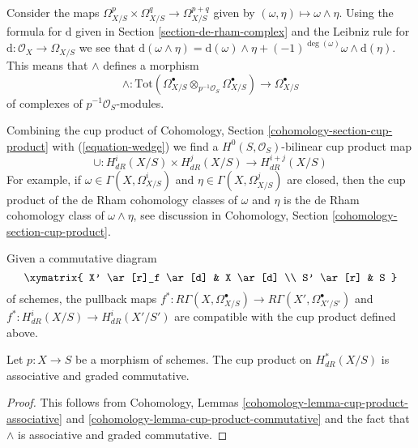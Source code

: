 \noindent
Consider the maps
$\Omega^p_{X/S} \times \Omega^q_{X/S} \to \Omega^{p + q}_{X/S}$
given by $(\omega , \eta) \longmapsto \omega \wedge \eta$.
Using the formula for $\text{d}$ given in Section \ref{section-de-rham-complex}
and the Leibniz rule for $\text{d} : \mathcal{O}_X \to \Omega_{X/S}$
we see that $\text{d}(\omega \wedge \eta) = \text{d}(\omega) \wedge \eta +
(-1)^{\deg(\omega)} \omega \wedge \text{d}(\eta)$. This means that
$\wedge$ defines a morphism
\begin{equation}
\label{equation-wedge}
\wedge :
\text{Tot}(
\Omega^\bullet_{X/S} \otimes_{p^{-1}\mathcal{O}_S} \Omega^\bullet_{X/S})
\longrightarrow
\Omega^\bullet_{X/S}
\end{equation}
of complexes of $p^{-1}\mathcal{O}_S$-modules.

\medskip\noindent
Combining the cup product of
Cohomology, Section \ref{cohomology-section-cup-product}
with (\ref{equation-wedge}) we find a
$H^0(S, \mathcal{O}_S)$-bilinear cup product map
$$
\cup : H^i_{dR}(X/S) \times H^j_{dR}(X/S) \longrightarrow H^{i + j}_{dR}(X/S)
$$
For example, if $\omega \in \Gamma(X, \Omega^i_{X/S})$ and
$\eta \in \Gamma(X, \Omega^j_{X/S})$ are closed, then
the cup product of the de Rham cohomology classes of
$\omega$ and $\eta$ is the de Rham cohomology class of $\omega \wedge \eta$,
see discussion in Cohomology, Section \ref{cohomology-section-cup-product}.

\medskip\noindent
Given a commutative diagram
$$
\xymatrix{
X' \ar[r]_f \ar[d] & X \ar[d] \\
S' \ar[r] & S
}
$$
of schemes, the pullback maps
$f^* : R\Gamma(X, \Omega^\bullet_{X/S}) \to R\Gamma(X', \Omega^\bullet_{X'/S'})$
and
$f^* : H^i_{dR}(X/S) \longrightarrow H^i_{dR}(X'/S')$
are compatible with the cup product defined above.

\begin{lemma}
\label{lemma-cup-product-graded-commutative}
Let $p : X \to S$ be a morphism of schemes.
The cup product on $H^*_{dR}(X/S)$ is associative and
graded commutative.
\end{lemma}

\begin{proof}
This follows from
Cohomology, Lemmas \ref{cohomology-lemma-cup-product-associative} and
\ref{cohomology-lemma-cup-product-commutative}
and the fact that $\wedge$ is associative and graded commutative.
\end{proof}

